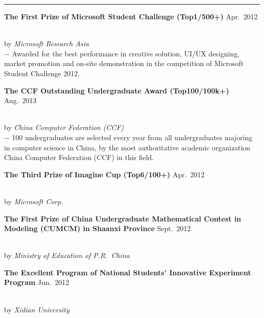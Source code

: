 \documentclass[a4paper,10pt]{article}
\newcommand{\shadedsection}[1]{
    \setlength{\fboxsep}{0pt}
    \colorbox{shadecolor}{%
        \begin{minipage}{\linewidth}%
            \vspace{0.2em}%
            #1%
        \end{minipage}%
    }
}
\newenvironment{rSection}[1]{ %
  \medskip
  \hspace{-1.5em}{\color{Blue}\MakeUppercase{\large \bf {#1}}} %
  \vspace{-0.2em}
  \medskip
  \hrule %
  \begin{list}{}{ %
    \setlength{\leftmargin}{1.5em} %
  }
\setlength{\itemsep}{1pt}
  \item[]
}{
  \end{list}
}
\newcommand{\detail}[1]{{$-$ {#1}}}
\newcommand{\honor}[3]{\shadedsection{{\bf #1} \hfill {#2}}\\by {\em {#3}}}
\begin{document}
\begin{rSection}{Main Honors}
  \vspace{-1.5em}
  \item
    \honor{The First Prize of Microsoft Student Challenge (Top1/500+)}{Apr.~2012}{Microsoft Research Asia}\\
    \detail{Awarded for the best performance in creative solution, UI/UX designing, market promotion and on-site demonstration in the competition of Microsoft Student Challenge 2012.}\\
    \honor{The CCF Outstanding Undergraduate Award (Top100/100k+)}{Aug.~2013}{China Computer Federation (CCF)}\\
    \detail{100 undergraduates are selected every year from all undergraduates majoring in computer science in China, by the most authoritative academic organization China Computer Federation (CCF) in this field.}\\
    \honor{The Third Prize of Imagine Cup (Top6/100+)}{Apr.~2012}{Microsoft Corp.}\\
    \honor{The First Prize of China Undergraduate Mathematical Contest in Modeling (CUMCM) in Shaanxi Province}{Sept.~2012}{Ministry of Education of P.R.~China}\\
    \honor{The Excellent Program of National Students' Innovative Experiment Program}{Jun.~2012}{Xidian University}
\end{rSection}

\vspace{-0.5em}
\end{document}
